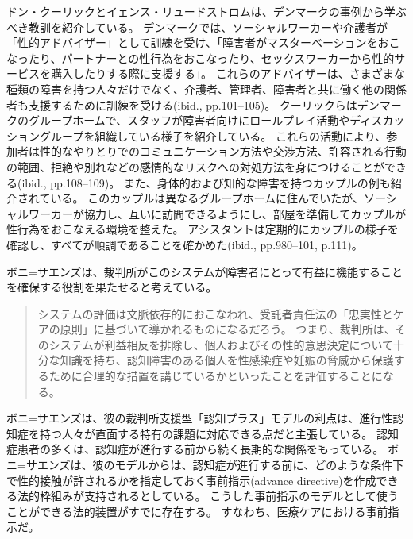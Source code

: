 \documentclass[paper=a4,book,openany]{jlreq}
\begin{document}
ドン・クーリックとイェンス・リュードストロムは、デンマークの事例から学ぶべき教訓を紹介している。
デンマークでは、ソーシャルワーカーや介護者が「性的アドバイザー」として訓練を受け、「障害者がマスターベーションをおこなったり、パートナーとの性行為をおこなったり、セックスワーカーから性的サービスを購入したりする際に支援する」\citep[p.18]{kulick15:_lonel_its_oppos}。
これらのアドバイザーは、さまざまな種類の障害を持つ人々だけでなく、介護者、管理者、障害者と共に働く他の関係者も支援するために訓練を受ける(ibid., pp.101--105)。
クーリックらはデンマークのグループホームで、スタッフが障害者向けにロールプレイ活動やディスカッショングループを組織している様子を紹介している。
これらの活動により、参加者は性的なやりとりでのコミュニケーション方法や交渉方法、許容される行動の範囲、拒絶や別れなどの感情的なリスクへの対処方法を身につけることができる(ibid., pp.108--109)。
また、身体的および知的な障害を持つカップルの例も紹介されている。
このカップルは異なるグループホームに住んでいたが、ソーシャルワーカーが協力し、互いに訪問できるようにし、部屋を準備してカップルが性行為をおこなえる環境を整えた。
アシスタントは定期的にカップルの様子を確認し、すべてが順調であることを確かめた(ibid., pp.980--101, p.111)。

ボニ=サエンズは、裁判所がこのシステムが障害者にとって有益に機能することを確保する役割を果たせると考えている。

\begin{quote}
システムの評価は文脈依存的におこなわれ、受託者責任法の「忠実性とケアの原則」に基づいて導かれるものになるだろう。
つまり、裁判所は、そのシステムが利益相反を排除し、個人およびその性的意思決定について十分な知識を持ち、認知障害のある個人を性感染症や妊娠の脅威から保護するために合理的な措置を講じているかといったことを評価することになる。
\citep[p.1234]{boni-saenz15:_sexual_incap}
\end{quote}

ボニ=サエンズは、彼の裁判所支援型「認知プラス」モデルの利点は、進行性認知症を持つ人々が直面する特有の課題に対応できる点だと主張している。
認知症患者の多くは、認知症が進行する前から続く長期的な関係をもっている。
ボニ=サエンズは、彼のモデルからは、認知症が進行する前に、どのような条件下で性的接触が許されるかを指定しておく事前指示(advance directive)を作成できる法的枠組みが支持されるとしている。
こうした事前指示のモデルとして使うことができる法的装置がすでに存在する。
すなわち、医療ケアにおける事前指示だ。
\end{document}
